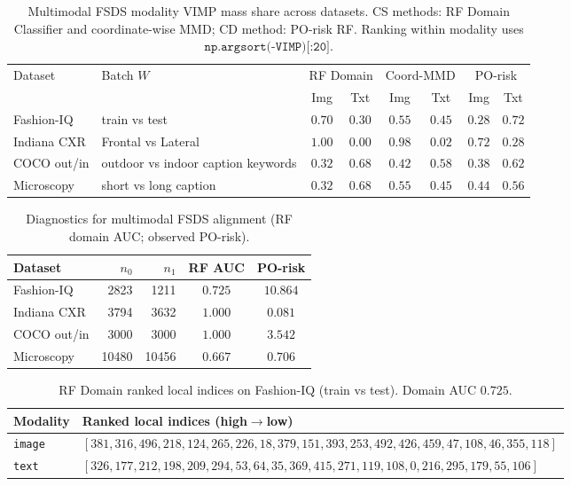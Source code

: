 
\begin{table}[ht]
\centering
\caption{Multimodal FSDS modality VIMP mass share across datasets. CS methods: RF Domain Classifier and coordinate-wise MMD; CD method: PO-risk RF. Ranking within modality uses $\texttt{np.argsort(-VIMP)[:20]}$.}
\label{tab:mm-fsds-align-mass}
\small
\begin{tabular}{@{}l l cc cc cc@{}}
\toprule
Dataset & Batch $W$ & \multicolumn{2}{c}{RF Domain} & \multicolumn{2}{c}{Coord-MMD} & \multicolumn{2}{c}{PO-risk} \\
\cmidrule(lr){3-4}\cmidrule(lr){5-6}\cmidrule(lr){7-8}
 &  & Img & Txt & Img & Txt & Img & Txt \\
\midrule
Fashion-IQ & train vs test & $0.70$ & $0.30$ & $0.55$ & $0.45$ & $0.28$ & $0.72$ \\
Indiana CXR & Frontal vs Lateral & $1.00$ & $0.00$ & $0.98$ & $0.02$ & $0.72$ & $0.28$ \\
COCO out/in & outdoor vs indoor caption keywords & $0.32$ & $0.68$ & $0.42$ & $0.58$ & $0.38$ & $0.62$ \\
Microscopy & short vs long caption & $0.32$ & $0.68$ & $0.55$ & $0.45$ & $0.44$ & $0.56$ \\
\bottomrule
\end{tabular}
\end{table}

\begin{table}[ht]
\centering
\caption{Diagnostics for multimodal FSDS alignment (RF domain AUC; observed PO-risk).}
\label{tab:mm-fsds-align-diag}
\small
\begin{tabular}{@{}l r r c c@{}}
\toprule
Dataset & $n_0$ & $n_1$ & RF AUC & PO-risk \\
\midrule
Fashion-IQ & 2823 & 1211 & $0.725$ & $10.864$ \\
Indiana CXR & 3794 & 3632 & $1.000$ & $0.081$ \\
COCO out/in & 3000 & 3000 & $1.000$ & $3.542$ \\
Microscopy & 10480 & 10456 & $0.667$ & $0.706$ \\
\bottomrule
\end{tabular}
\end{table}

\begin{table}[ht]
\centering
\caption{RF Domain ranked local indices on Fashion-IQ (train vs test). Domain AUC $0.725$.}
\label{tab:mm-fsds-fashion_iq-rf}
\small
\begin{tabular}{@{}l p{11.2cm}@{}}
\toprule
Modality & Ranked local indices (high$\to$low) \\
\midrule
\texttt{image} & $[381,316,496,218,124,265,226,18,379,151,393,253,492,426,459,47,108,46,355,118]$ \\
\texttt{text} & $[326,177,212,198,209,294,53,64,35,369,415,271,119,108,0,216,295,179,55,106]$ \\
\bottomrule
\end{tabular}
\end{table}

